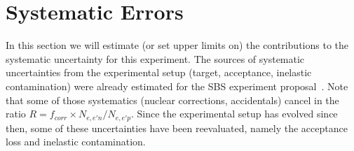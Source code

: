 \section{Systematic Errors}

In this section we will estimate (or set upper limits on) the contributions to the systematic uncertainty for this experiment.
The sources of systematic uncertainties from the experimental setup (target, acceptance, inelastic contamination) were already estimated for the SBS \gmn experiment proposal~\cite{E12-09-019}.
Note that some of those systematics (nuclear corrections, accidentals) cancel in the ratio $R = f_{corr} \times N_{e,e'n}/N_{e,e'p}$.
Since the experimental setup has evolved since then, some of these uncertainties have been reevaluated, namely the acceptance loss and inelastic contamination.

